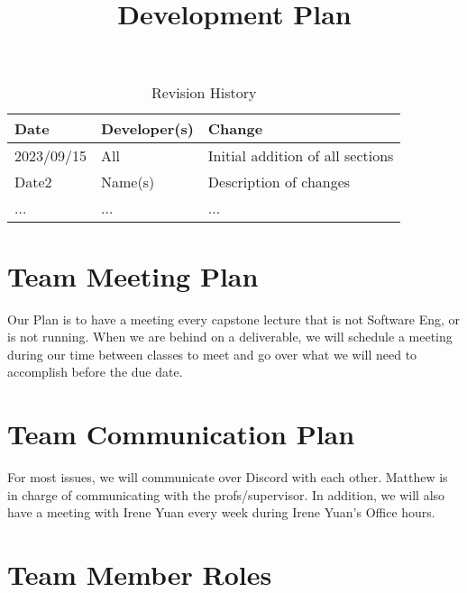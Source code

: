 \documentclass{article}
\title{Development Plan\\\progname}
\author{\authname}
\date{}
\begin{document}
\maketitle

\begin{table}[hp]
\caption{Revision History} \label{TblRevisionHistory}
\begin{tabularx}{\textwidth}{llX}
\toprule
\textbf{Date} & \textbf{Developer(s)} & \textbf{Change}\\
\midrule
2023/09/15 & All & Initial addition of all sections\\
Date2 & Name(s) & Description of changes\\
... & ... & ...\\
\bottomrule
\end{tabularx}
\end{table}


\section{Team Meeting Plan}

Our Plan is to have a meeting every capstone lecture that is not Software Eng, or is not running. When we are behind on a deliverable, we will schedule a meeting during our time between classes to meet and go over what we will need to accomplish before the due date.

\section{Team Communication Plan}
For most issues, we will communicate over Discord with each other. Matthew is in charge of communicating with the profs/supervisor. In addition, we will also have a meeting with Irene Yuan every week during Irene Yuan's Office hours. 
\newpage
\section{Team Member Roles}
\end{document}
